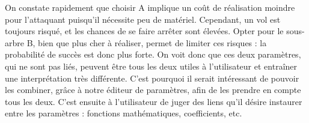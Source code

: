 On constate rapidement que choisir A implique un coût de réalisation moindre pour l'attaquant puisqu'il nécessite peu de matériel. Cependant, un vol est toujours risqué, et les chances de se faire arrêter sont élevées. Opter pour le sous-arbre B, bien que plus cher à réaliser, permet de limiter ces risques : la probabilité de succès est donc plus forte. On voit donc que ces deux paramètres, qui ne sont pas liés, peuvent être tous les deux utiles à l'utilisateur et entraîner une interprétation très différente. C'est pourquoi il serait intéressant de pouvoir les combiner, grâce à notre éditeur de paramètres, afin de les prendre en compte tous les deux. C'est ensuite à l'utilisateur de juger des liens qu'il désire instaurer entre les paramètres : fonctions mathématiques, coefficients, etc.
